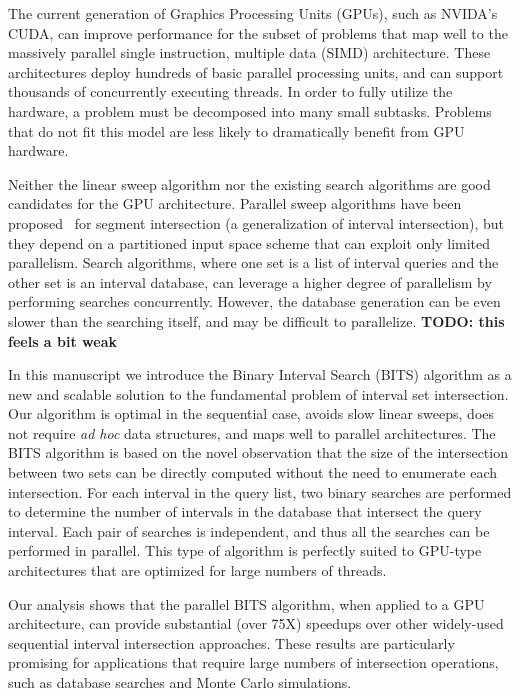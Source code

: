 \documentclass{bioinfo}
\begin{document}
	The current generation of Graphics Processing Units (GPUs), such as NVIDA's
	CUDA, can improve performance for the subset of problems that map well to the
	massively parallel single instruction, multiple data (SIMD) architecture.  These
	architectures deploy hundreds of basic parallel processing units, and can
	support thousands of concurrently executing threads.  In order to fully utilize
	the hardware, a problem must be decomposed into many small subtasks.   Problems
	that do not fit this model are less likely to dramatically benefit from GPU
	hardware.

	Neither the linear sweep algorithm nor the existing search algorithms are good
	candidates for the GPU architecture.  Parallel sweep algorithms have been
	proposed~\citep{goodrich1993, kriegel1991, mckenney2009} for segment
	intersection (a generalization of interval intersection), but they depend on a
	partitioned input space scheme that can exploit only limited parallelism.
	Search algorithms, where one set is a list of interval queries and the other set
	is an interval database, can leverage a higher degree of parallelism by
	performing searches concurrently.  However, the database generation can be even
	slower than the searching itself, and may be difficult to parallelize. 
	\textbf{TODO: this feels a bit weak}

	In this manuscript we introduce the Binary Interval Search (BITS) algorithm 
	as a new and scalable solution to the fundamental problem of interval set 
	intersection.  Our algorithm is optimal in the sequential case, avoids slow 
	linear sweeps, does not require \emph{ad hoc} data structures, and maps well 
	to parallel architectures.  The BITS algorithm is based on the novel 
	observation that the size of the intersection between two sets can be directly 
	computed without the need to enumerate each intersection. For each interval 
	in the query list, two binary searches are performed to determine the number 
	of intervals in the database that intersect the query interval.  Each pair of searches 
	is independent, and thus all the searches can be performed in parallel.  This type of 
	algorithm is perfectly suited to GPU-type architectures that are optimized 
	for large numbers of threads.

	Our analysis shows that the parallel BITS algorithm, when applied to a GPU
	architecture, can provide substantial (over 75X) speedups over other widely-used
	sequential interval intersection approaches. These results are particularly
	promising for applications that require large numbers of intersection
	operations, such as database searches and Monte Carlo simulations.
\end{document}
